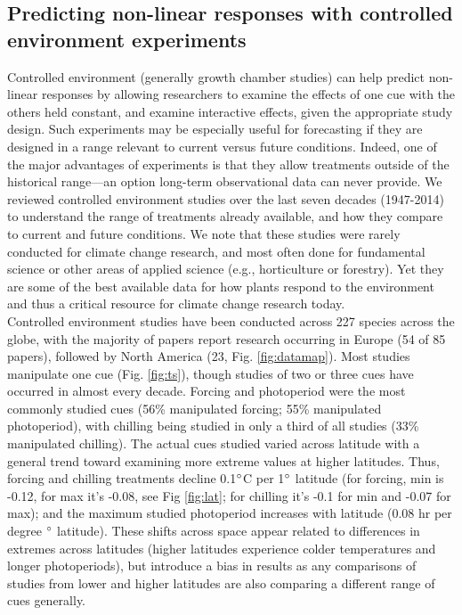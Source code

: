 \documentclass[11pt,letter]{article}
\begin{document}
\subsection{Predicting non-linear responses with controlled environment experiments} %

Controlled environment (generally growth chamber studies) can help predict non-linear responses by allowing researchers to examine the effects of one cue with the others held constant, and examine interactive effects, given the appropriate study design. Such experiments may be especially useful for forecasting if they are designed in a range relevant to current versus future conditions. Indeed, one of the major advantages of experiments is that they allow treatments outside of the historical range---an option long-term observational data can never provide. We reviewed controlled environment studies over the last seven decades (1947-2014) to understand the range of treatments already available, and how they compare to current and future conditions. We note that these studies were rarely conducted for climate change research, and most often done for fundamental science or other areas of applied science (e.g., horticulture or forestry). Yet they are some of the best available data for how plants respond to the environment and thus a critical resource for climate change research today.\\

Controlled environment studies have been conducted across 227 species across the globe, with the majority of papers report research occurring in Europe (54 of 85 papers), followed by North America (23, Fig. \ref{fig:datamap}). Most studies manipulate one cue (Fig. \ref{fig:ts}), though studies of two or three cues have occurred in almost every decade. Forcing and photoperiod were the most commonly studied cues (56\% manipulated forcing; 55\% manipulated photoperiod), with chilling being studied in only a third of all studies (33\% manipulated chilling). The actual cues studied varied across latitude with a general trend toward examining more extreme values at higher latitudes. Thus, forcing and chilling treatments decline 0.1$\degree$C per 1$\degree$ latitude (for forcing, min is -0.12, for max it's -0.08, see Fig \ref{fig:lat}; for chilling it's -0.1 for min and -0.07 for max); and the maximum studied photoperiod increases with latitude (0.08 hr per degree $\degree$ latitude). These shifts across space appear related to differences in extremes across latitudes (higher latitudes experience colder temperatures and longer photoperiods), but introduce a bias in results as any comparisons of studies from lower and higher latitudes are also comparing a different range of cues generally. \\
\end{document}
